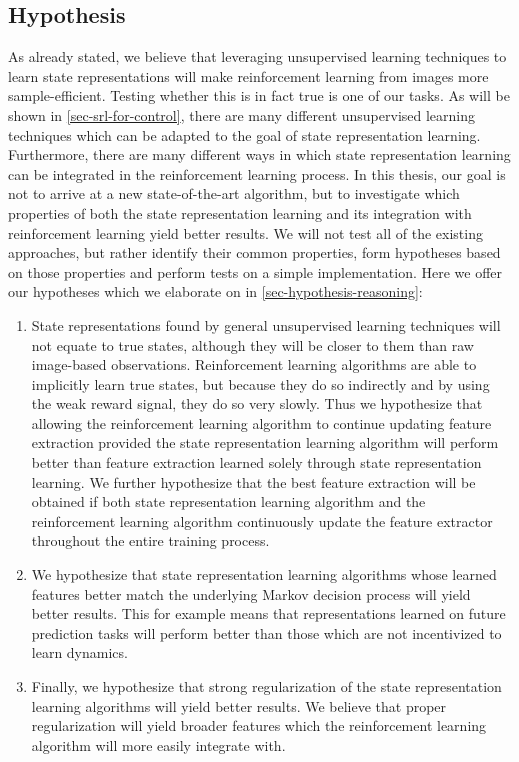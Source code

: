 \subsection{Hypothesis}
\label{subsec-hypothesis}
As already stated, we believe that leveraging unsupervised learning techniques
to learn state representations will make reinforcement learning from images
more sample-efficient.
Testing whether this is in fact true is one of our tasks.
As will be shown in \ref{sec-srl-for-control}, there are many different unsupervised learning
techniques which can be adapted to the goal of state representation learning.
Furthermore, there are many different ways in which state representation learning can be integrated
in the reinforcement learning process.
In this thesis, our goal is not to arrive at a new state-of-the-art algorithm,
but to investigate which properties of both the state representation learning and its integration
with reinforcement learning yield better results.
We will not test all of the existing approaches, but rather identify their common properties,
form hypotheses based on those properties and perform tests on a simple implementation.
Here we offer our hypotheses which we elaborate on in \ref{sec-hypothesis-reasoning}:
\begin{enumerate}
		\item State representations found by general unsupervised learning techniques 
		will not equate to true states, although they will be closer to them than
		raw image-based observations. Reinforcement learning algorithms are able
		to implicitly learn true states, but because they do so indirectly and by using
		the weak reward signal, they do so very slowly.
		Thus we hypothesize that allowing the reinforcement learning algorithm to continue updating
		feature extraction provided the state representation learning algorithm will perform better
		than feature extraction learned solely through state representation learning.
		We further hypothesize that the best feature extraction will be obtained if both
		state representation learning algorithm and the reinforcement learning algorithm 
		continuously update the feature extractor throughout the entire training process.
		\label{parallel-training-hypothesis}
\item We hypothesize that state representation learning algorithms whose learned features better match the underlying
		Markov decision process will yield better results.
		This for example means that representations learned on future prediction tasks will
		perform better than those which are not incentivized to learn dynamics.
		\label{good-features-hypothesis}
\item Finally, we hypothesize that strong regularization of the state representation learning
		algorithms will yield better results. We believe that proper regularization will
		yield broader features which the reinforcement learning algorithm will 
		more easily integrate with.
		\label{regularization-hypothesis}
\end{enumerate}




